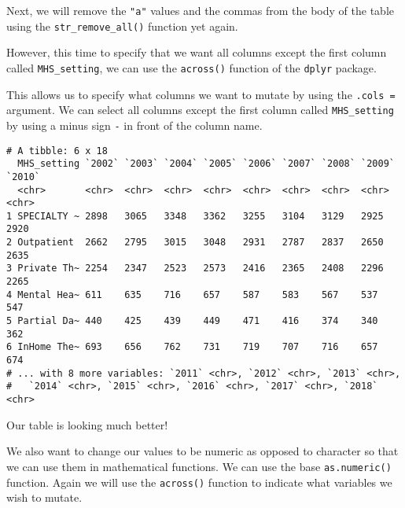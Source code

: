 \documentclass[
]{article}
\newenvironment{Shaded}{\begin{snugshade}}{\end{snugshade}}
\newcommand{\DataTypeTok}[1]{\textcolor[rgb]{0.13,0.29,0.53}{#1}}
\newcommand{\FloatTok}[1]{\textcolor[rgb]{0.00,0.00,0.81}{#1}}
\newcommand{\KeywordTok}[1]{\textcolor[rgb]{0.13,0.29,0.53}{\textbf{#1}}}
\newcommand{\NormalTok}[1]{#1}
\newcommand{\OperatorTok}[1]{\textcolor[rgb]{0.81,0.36,0.00}{\textbf{#1}}}
\newcommand{\StringTok}[1]{\textcolor[rgb]{0.31,0.60,0.02}{#1}}
\begin{document}
Next, we will remove the \texttt{"a"} values and the commas from the
body of the table using the \texttt{str\_remove\_all()} function yet
again.

However, this time to specify that we want all columns except the first
column called \texttt{MHS\_setting}, we can use the \texttt{across()}
function of the \texttt{dplyr} package.

This allows us to specify what columns we want to mutate by using the
\texttt{.cols\ =} argument. We can select all columns except the first
column called \texttt{MHS\_setting} by using a minus sign \texttt{-} in
front of the column name.

\begin{Shaded}
\end{Shaded}

\begin{verbatim}
# A tibble: 6 x 18
  MHS_setting `2002` `2003` `2004` `2005` `2006` `2007` `2008` `2009` `2010`
  <chr>       <chr>  <chr>  <chr>  <chr>  <chr>  <chr>  <chr>  <chr>  <chr> 
1 SPECIALTY ~ 2898   3065   3348   3362   3255   3104   3129   2925   2920  
2 Outpatient  2662   2795   3015   3048   2931   2787   2837   2650   2635  
3 Private Th~ 2254   2347   2523   2573   2416   2365   2408   2296   2265  
4 Mental Hea~ 611    635    716    657    587    583    567    537    547   
5 Partial Da~ 440    425    439    449    471    416    374    340    362   
6 InHome The~ 693    656    762    731    719    707    716    657    674   
# ... with 8 more variables: `2011` <chr>, `2012` <chr>, `2013` <chr>,
#   `2014` <chr>, `2015` <chr>, `2016` <chr>, `2017` <chr>, `2018` <chr>
\end{verbatim}

Our table is looking much better!

We also want to change our values to be numeric as opposed to character
so that we can use them in mathematical functions. We can use the base
\texttt{as.numeric()} function. Again we will use the \texttt{across()}
function to indicate what variables we wish to mutate.
\end{document}
